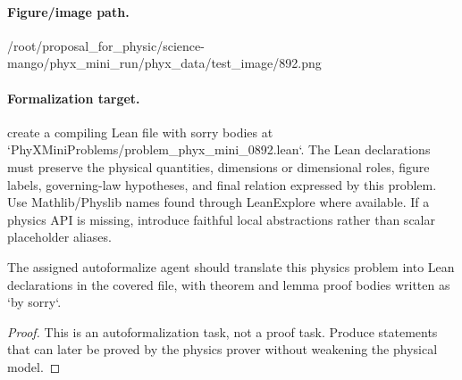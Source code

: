 \paragraph{Figure/image path.}
/root/proposal\_for\_physic/science-mango/phyx\_mini\_run/phyx\_data/test\_image/892.png

\paragraph{Formalization target.}
create a compiling Lean file with sorry bodies at `PhyXMiniProblems/problem\_phyx\_mini\_0892.lean`. The Lean declarations must preserve the physical quantities, dimensions or dimensional roles, figure labels, governing-law hypotheses, and final relation expressed by this problem.
Use Mathlib/Physlib names found through LeanExplore where available. If a physics API is missing, introduce faithful local abstractions rather than scalar placeholder aliases.

\begin{theorem}
\label{thm:physics:phyx_mini_0892:target}
The assigned autoformalize agent should translate this physics problem into Lean declarations in the covered file, with theorem and lemma proof bodies written as `by sorry`.
\end{theorem}
\begin{proof}
This is an autoformalization task, not a proof task. Produce statements that can later be proved by the physics prover without weakening the physical model.
\end{proof}

